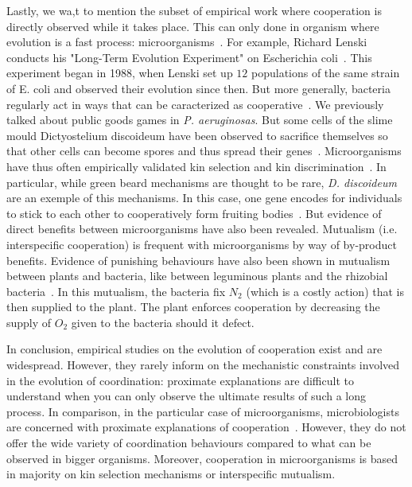     Lastly, we wa,t to mention the subset of empirical work where cooperation is directly observed while it takes place. This can only done in organism where evolution is a fast process: microorganisms~\parencite{Elena2003}. For example, Richard Lenski conducts his "Long-Term Evolution Experiment" on Escherichia coli~\parencite{Fox2015}. This experiment began in 1988, when Lenski set up $12$ populations of the same strain of E. coli and observed their evolution since then. But more generally, bacteria regularly act in ways that can be caracterized as cooperative~\parencite{West2006}. We previously talked about public goods games in \emph{P. aeruginosas}. But some cells of the slime mould Dictyostelium discoideum have been observed to sacrifice themselves so that other cells can become spores and thus spread their genes~\parencite{Strassmann2000}. Microorganisms have thus often empirically validated kin selection and kin discrimination~\parencite{West2006}. In particular, while green beard mechanisms are thought to be rare, \emph{D. discoideum} are an exemple of this mechanisms. In this case, one gene encodes for individuals to stick to each other to cooperatively form fruiting bodies~\parencite{Queller2003}. But evidence of direct benefits between microorganisms have also been revealed. Mutualism (i.e. interspecific cooperation) is frequent with microorganisms by way of by-product benefits. Evidence of punishing behaviours have also been shown in mutualism between plants and bacteria, like between leguminous plants and the rhizobial bacteria~\parencite{Kiers2003}. In this mutualism, the bacteria fix $N_{2}$ (which is a costly action) that is then supplied to the plant. The plant enforces cooperation by decreasing the supply of $O_{2}$ given to the bacteria should it defect. 


    In conclusion, empirical studies on the evolution of cooperation exist and are widespread. However, they rarely inform on the mechanistic constraints involved in the evolution of coordination: proximate explanations are difficult to understand when you can only observe the ultimate results of such a long process. In comparison, in the particular case of microorganisms, microbiologists are concerned with proximate explanations of cooperation~\parencite{West2006}. However, they do not offer the wide variety of coordination behaviours compared to what can be observed in bigger organisms. Moreover, cooperation in microorganisms is based in majority on kin selection mechanisms or interspecific mutualism.

